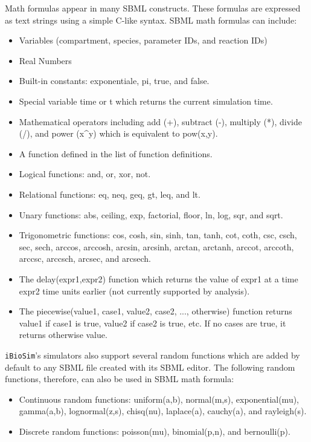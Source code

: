 \documentclass[titlepage,11pt]{article}
\begin{document}
\noindent
Math formulas appear in many SBML constructs.  These formulas are 
expressed as text strings using a simple C-like syntax. 
SBML math formulas can include: 
\begin{itemize}
\item Variables (compartment, species, parameter IDs, and reaction IDs)
\item Real Numbers
\item Built-in constants: exponentiale, pi, true, and false.
\item Special variable time or t which returns the current simulation time.
\item Mathematical operators including add (+), subtract (-), multiply
  (*), divide (/), and power (x\^{}y) which is equivalent to pow(x,y).
\item A function defined in the list of function definitions.
\item Logical functions: and, or, xor, not.
\item Relational functions: eq, neq, geq, gt, leq, and lt.
\item Unary functions: abs, ceiling, exp, factorial, floor, ln, log,
  sqr, and sqrt.
\item Trigonometric functions: cos, cosh, sin, sinh, tan, tanh, cot,
  coth, csc, csch, sec, sech, arccos, arccosh, arcsin, arcsinh,
  arctan, arctanh, arccot, arccoth, arccsc, arccsch, arcsec, and arcsech.
\item The delay(expr1,expr2) function which returns the value of expr1 at a time
      expr2 time units earlier (not currently supported by analysis).
\item The piecewise(value1, case1, value2, case2, ..., otherwise)
  function returns value1 if case1 is true, value2 if case2 is true,
  etc.  If no cases are true, it returns otherwise value.
\end{itemize}

{\tt iBioSim}'s simulators also support several random functions which
are added by default to any SBML file created with its SBML editor.  
The following random functions, therefore, can also be used in SBML
math formula:
\begin{itemize}
\item Continuous random functions: uniform(a,b), normal(m,s), exponential(mu), 
  gamma(a,b), lognormal(z,s), chisq(nu), laplace(a), cauchy(a), and 
  rayleigh(s).
\item Discrete random functions: poisson(mu), binomial(p,n), and bernoulli(p).
\end{itemize}
\end{document}
